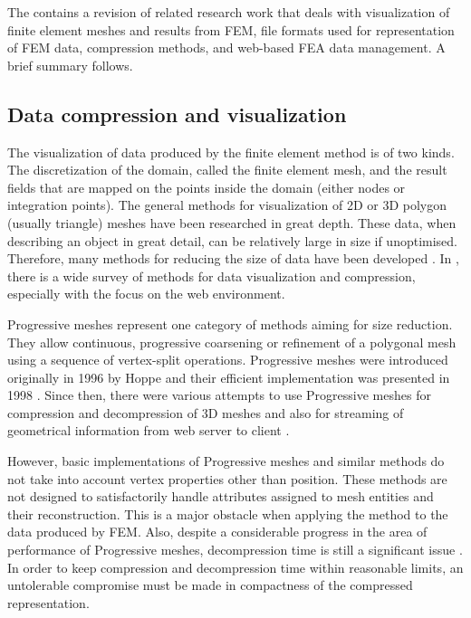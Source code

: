 The contains a revision of related research work that deals with visualization of finite element meshes and results from FEM, file formats used for representation of FEM data, compression methods, and web-based FEA data management. A brief summary follows.


\subsection{Data compression and visualization}

The visualization of data produced by the finite element method is of two kinds. The discretization of the domain, called the finite element mesh, and the result fields that are mapped on the points inside the domain (either nodes or integration points). The general methods for visualization of 2D or 3D polygon (usually triangle) meshes have been researched in great depth. These data, when describing an object in great detail, can be relatively large in size if unoptimised. Therefore, many methods for reducing the size of data have been developed \cite{Alliez2005}. In \cite{Evans2014}, there is a wide survey of methods for data visualization and compression, especially with the focus on the web environment.

Progressive meshes represent one category of methods aiming for size reduction. They allow continuous, progressive coarsening or refinement of a polygonal mesh using a sequence of vertex-split operations. Progressive meshes were introduced originally in 1996 by Hoppe \cite{Hoppe1996} and their efficient implementation was presented in 1998 \cite{Hoppe1998}. Since then, there were various attempts to use Progressive meshes for compression and decompression of 3D meshes \cite{Gudukbay2002, Valette2004, Valette2009, Lavoue2013} and also for streaming of geometrical information from web server to client \cite{Alliez2001, Maglo2012}.

However, basic implementations of Progressive meshes and similar methods do not take into account vertex properties other than position. These methods are not designed to satisfactorily handle attributes assigned to mesh entities and their reconstruction. This is a major obstacle when applying the method to the data produced by FEM. Also, despite a considerable progress in the area of performance of Progressive meshes, decompression time is still a significant issue \cite{Limper2013}. In order to keep compression and decompression time within reasonable limits, an untolerable compromise must be made in compactness of the compressed representation.

